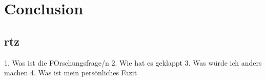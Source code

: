 \chapter{Conclusion}
\label{chap:09_conclusion}


\section{rtz}

1. Was ist die FOrschungsfrage/n
2. Wie hat es geklappt
3. Was würde ich anders machen
4. Was ist mein persönliches Fazit

